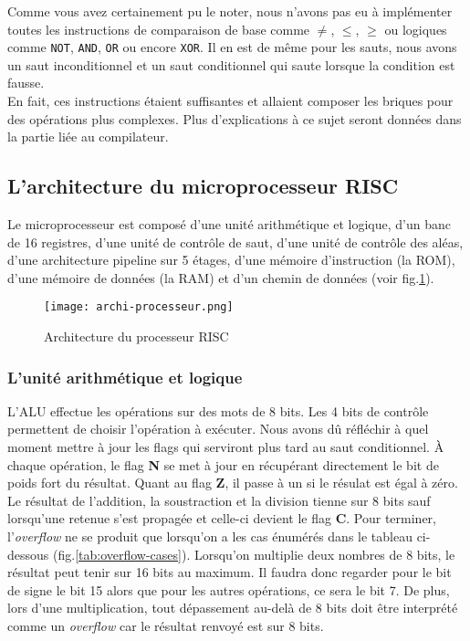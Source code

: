 Comme vous avez certainement pu le noter, nous n'avons pas eu à implémenter toutes les instructions de comparaison de base comme $\neq$, $\leq$, $\geq$ ou logiques comme \texttt{NOT}, \texttt{AND}, \texttt{OR} ou encore \texttt{XOR}. Il en est de même pour les sauts, nous avons un saut inconditionnel et un saut conditionnel qui saute lorsque la condition est fausse.\\
En fait, ces instructions étaient suffisantes et allaient composer les briques pour des opérations plus complexes. Plus d'explications à ce sujet seront données dans la partie liée au compilateur.

\subsection{L'architecture du microprocesseur RISC}

Le microprocesseur est composé d'une unité arithmétique et logique, d'un banc de 16 registres, d'une unité de contrôle de saut, d'une unité de contrôle des aléas, d'une architecture pipeline sur 5 étages, d'une mémoire d'instruction (la ROM), d'une mémoire de données (la RAM) et d'un chemin de données (voir fig.\ref{archi-processeur}).

\begin{figure}[!h]
    \centering
    \texttt{[image: archi-processeur.png]}
    \caption{Architecture du processeur RISC}
    \label{archi-processeur}
\end{figure}

\subsubsection*{L'unité arithmétique et logique}

L'ALU effectue les opérations sur des mots de 8 bits. Les 4 bits de contrôle permettent de choisir l'opération à exécuter. Nous avons dû réfléchir à quel moment mettre à jour les flags qui serviront plus tard au saut conditionnel. À chaque opération, le flag \textbf{N} se met à jour en récupérant directement le bit de poids fort du résultat. Quant au flag \textbf{Z}, il passe à un si le résulat est égal à zéro. Le résultat de l'addition, la soustraction et la division tienne sur 8 bits sauf lorsqu'une retenue s'est propagée et celle-ci devient le flag \textbf{C}. Pour terminer, l'\textit{overflow} ne se produit que lorsqu'on a les cas énumérés dans le tableau ci-dessous (fig.\ref{tab:overflow-cases}). Lorsqu'on multiplie deux nombres de 8 bits, le résultat peut tenir sur 16 bits au maximum. Il faudra donc regarder pour le bit de signe le bit 15 alors que pour les autres opérations, ce sera le bit 7. De plus, lors d'une multiplication, tout dépassement au-delà de 8 bits doit être interprété comme un \textit{overflow} car le résultat renvoyé est sur 8 bits.

